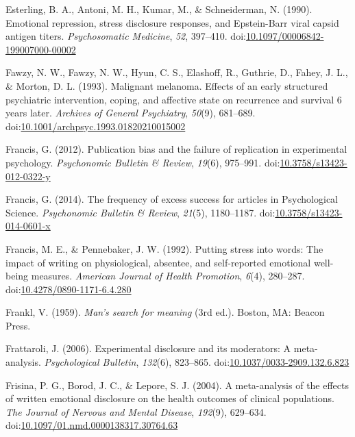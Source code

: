 \documentclass[english,man, mask]{apa6}
\theoremstyle{definition}
\theoremstyle{definition}
\theoremstyle{definition}
\theoremstyle{remark}
\begin{document}
\hypertarget{ref-Esterling1990}{}
Esterling, B. A., Antoni, M. H., Kumar, M., \& Schneiderman, N. (1990).
Emotional repression, stress disclosure responses, and Epstein-Barr
viral capsid antigen titers. \emph{Psychosomatic Medicine}, \emph{52},
397--410.
doi:\href{https://doi.org/10.1097/00006842-199007000-00002}{10.1097/00006842-199007000-00002}

\hypertarget{ref-Fawzy1993}{}
Fawzy, N. W., Fawzy, N. W., Hyun, C. S., Elashoff, R., Guthrie, D.,
Fahey, J. L., \& Morton, D. L. (1993). Malignant melanoma. Effects of an
early structured psychiatric intervention, coping, and affective state
on recurrence and survival 6 years later. \emph{Archives of General
Psychiatry}, \emph{50}(9), 681--689.
doi:\href{https://doi.org/10.1001/archpsyc.1993.01820210015002}{10.1001/archpsyc.1993.01820210015002}

\hypertarget{ref-Francis2012}{}
Francis, G. (2012). Publication bias and the failure of replication in
experimental psychology. \emph{Psychonomic Bulletin \& Review},
\emph{19}(6), 975--991.
doi:\href{https://doi.org/10.3758/s13423-012-0322-y}{10.3758/s13423-012-0322-y}

\hypertarget{ref-Francis2014}{}
Francis, G. (2014). The frequency of excess success for articles in
Psychological Science. \emph{Psychonomic Bulletin \& Review},
\emph{21}(5), 1180--1187.
doi:\href{https://doi.org/10.3758/s13423-014-0601-x}{10.3758/s13423-014-0601-x}

\hypertarget{ref-Francis1992}{}
Francis, M. E., \& Pennebaker, J. W. (1992). Putting stress into words:
The impact of writing on physiological, absentee, and self-reported
emotional well-being measures. \emph{American Journal of Health
Promotion}, \emph{6}(4), 280--287.
doi:\href{https://doi.org/10.4278/0890-1171-6.4.280}{10.4278/0890-1171-6.4.280}

\hypertarget{ref-Frankl1959}{}
Frankl, V. (1959). \emph{Man's search for meaning} (3rd ed.). Boston,
MA: Beacon Press.

\hypertarget{ref-Frattaroli2006}{}
Frattaroli, J. (2006). Experimental disclosure and its moderators: A
meta-analysis. \emph{Psychological Bulletin}, \emph{132}(6), 823--865.
doi:\href{https://doi.org/10.1037/0033-2909.132.6.823}{10.1037/0033-2909.132.6.823}

\hypertarget{ref-Frisina2004a}{}
Frisina, P. G., Borod, J. C., \& Lepore, S. J. (2004). A meta-analysis
of the effects of written emotional disclosure on the health outcomes of
clinical populations. \emph{The Journal of Nervous and Mental Disease},
\emph{192}(9), 629--634.
doi:\href{https://doi.org/10.1097/01.nmd.0000138317.30764.63}{10.1097/01.nmd.0000138317.30764.63}
\end{document}
